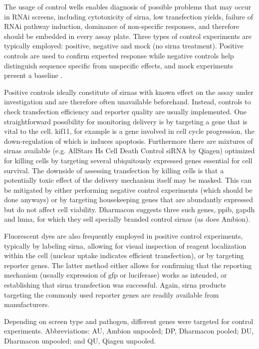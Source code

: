 The usage of control wells enables diagnosis of possible problems that may occur in RNAi screens, including cytotoxicity of \gls{sirna}, low transfection yields, failure of RNAi pathway induction, dominance of non-specific responses, and therefore should be embedded in every assay plate. Three types of control experiments are typically employed: positive, negative and mock (no \gls{sirna} treatment). Positive controls are used to confirm expected response while negative controls help distinguish sequence specific from unspecific effects, and mock experiments present a baseline \citep{Sittampalam2004}.

Positive controls ideally constitute of \glspl{sirna} with known effect on the assay under investigation and are therefore often unavailable beforehand. Instead, controls to check transfection efficiency and reporter quality are usually implemented. One straightforward possibility for monitoring delivery is by targeting a gene that is vital to the cell. \Gls{kif11}, for example is a gene involved in cell cycle progression, the down-regulation of which is induces apoptosis. Furthermore there are mixtures of \glspl{sirna} available (e.g. AllStars Hs Cell Death Control siRNA by Qiagen) optimized for killing cells by targeting several ubiquitously expressed genes essential for cell survival. The downside of assessing transfection by killing cells is that a potentially toxic effect of the delivery mechanism itself may be masked. This can be mitigated by either performing negative control experiments (which should be done anyways) or by targeting housekeeping genes that are abundantly expressed but do not affect cell viability. Dharmacon suggests three such genes, \gls{ppib}, \gls{gapdh} and \gls{lmna}, for which they sell specially branded control \glspl{sirna} (as does Ambion).

Fluorescent dyes are also frequently employed in positive control experiments, typically by labeling \gls{sirna}, allowing for visual inspection of reagent localization within the cell (nuclear uptake indicates efficient transfection), or by targeting reporter genes. The latter method either allows for confirming that the reporting mechanism (usually expression of \gls{gfp} or luciferase) works as intended, or establishing that \gls{sirna} transfection was successful. Again, \gls{sirna} products targeting the commonly used reporter genes are readily available from manufacturers.

\renewcommand{\arraystretch}{1.1}
\setlength{\tabcolsep}{0.14em}
\begin{table}
\begin{minipage}{\textwidth}
  \centering
  \caption[Control experiments used in the different screens.]{Depending on screen type and pathogen, different genes were targeted for control experiments. Abbreviations: AU, Ambion unpooled; DP, Dharmacon pooled; DU, Dharmacon unpooled; and QU, Qiagen unpooled.}
  \label{tab:infectx-control}
  \footnotesize
  
\end{minipage}
\end{table}

